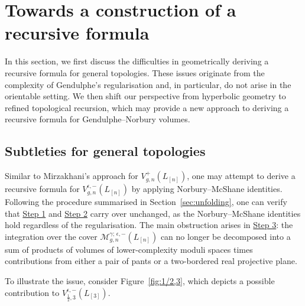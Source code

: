 \documentclass[12pt]{amsart}
\theoremstyle{plain}
\theoremstyle{definition}
\theoremstyle{remark}
\numberwithin{equation}{section}
\begin{document}
\section{Towards a construction of a recursive formula}\label{sec:higherTop}

In this section, we first discuss the difficulties in geometrically deriving a recursive formula for general topologies. These issues originate from the complexity of Gendulphe's regularisation and, in particular, do not arise in the orientable setting. We then shift our perspective from hyperbolic geometry to refined topological recursion, which may provide a new approach to deriving a recursive formula for Gendulphe--Norbury volumes.



\subsection{Subtleties for general topologies}

Similar to Mirzakhani's approach for $V_{g,n}^{+}(L_{[n]})$, one may attempt to derive a recursive formula for $V_{g,n}^{\epsilon,-}(L_{[n]})$ by applying Norbury--McShane identities. Following the procedure summarised in Section~\ref{sec:unfolding}, one can verify that \hyperref[item:Step1]{Step 1} and \hyperref[item:Step2]{Step 2} carry over unchanged, as the Norbury--McShane identities hold regardless of the regularisation. The main obstruction arises in \hyperref[item:Step3]{Step 3}: the integration over the cover $\mathcal{M}^{\gamma;\,\epsilon,-}_{g,n}(L_{[n]})$ can no longer be decomposed into a sum of products of volumes of lower-complexity moduli spaces times contributions from either a pair of pants or a two-bordered real projective plane.

To illustrate the issue, consider Figure~\ref{fig:1/2,3}, which depicts a possible contribution to $V_{\frac12,3}^{\epsilon,-}(L_{[3]})$.
\end{document}
